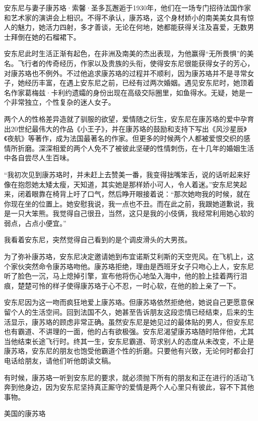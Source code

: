 安东尼与妻子康苏珞·索馨·圣多瓦邂逅于1930年，他们在一场专门招待法国作家和艺术家的演讲会上相识。不得不承认，康苏珞，这个身材娇小的南美美女具有惊人的魅力，她活力四射，多才善谈，无论在何地，她都能获得关注及喜爱，无数男士拜倒在她的石榴裙下。

安东尼此时生活正渐有起色，在非洲及南美的杰出表现，为他赢得“无所畏惧”的美名。飞行者的传奇经历，作家以及贵族的头衔，使得安东尼很能获得女子的芳心，对康苏珞也不例外。不过他追求康苏珞的过程并不顺利，因为康苏珞并不是寻常女子，她经历丰富，在遇上安东尼之前，已经有过两次婚姻。遇见安东尼时，她顶着名作家葛梅兹·卡利约遗孀的身份出现在高级交际圈里，如鱼得水。无疑，她是一个非常独立，个性复杂的迷人女子。

两个人的性格差异造就了驯服的欲望，爱情随之衍生，安东尼在康苏珞的爱中孕育出20世纪最伟大的作品《小王子》，并在康苏珞的鼓励和支持下写出《风沙星辰》《夜航》等著作，成为法国最著名的作家。但更多的时候两个人都被爱恨交织的感情所折磨。深深相爱的两个人免不了被彼此坚硬的性情刺伤，在十几年的婚姻生活中各自尝尽人生百味。

“我初次见到康苏珞时，并未赶上去赞美一番，我变得拙嘴笨舌，说的话听起来好像在抱怨她太矮太瘦，天知道，其实她是那样娇小可人，令人着迷。”安东尼笑起来，闭着眼靠在椅背上吁了口气，然后睁开眼接着说：“那次她吻我的时候，就在你现在坐的位置上。她安慰我说，我一点也不丑。而在此之前，我跟她道歉说，我是一只大笨熊。我觉得自己很丑，当然，这只是我的小伎俩，我经常利用她心软的弱点，占点小便宜。”

我看着安东尼，突然觉得自己看到的是个调皮滑头的大男孩。

为了弥补康苏珞，安东尼决定邀请她到布宜诺斯艾利斯的天空兜风。在飞机上，这个家伙突然命令康苏珞吻他。康苏珞拒绝，理由是西班牙女子只吻心上人，安东尼听了脸色一沉，马上熄掉引擎，宣布他将伤心地坠入海中，他的脸上挂着两行泪痕，楚楚可怜的样子使得康苏珞于心不忍，一时心软，在他的脸上亲了一下。

安东尼因为这一吻而疯狂地爱上康苏珞。但康苏珞依然拒绝他，她说自己更愿意保留个人的生活空间。回到法国不久，她甚至告诉朋友这段恋情已经结束，后来的生活显示，康苏珞的顾虑非常正确。虽然安东尼是她见过的最体贴的男人，但安东尼也有霸道、不讲理的一面，他的占有欲极强。安东尼渴望康苏珞随时陪伴他，尤其当他结束长途飞行时。终其一生，安东尼霸道、苛求别人的态度从未改变，不止是康苏珞，安东尼的朋友也饱受他霸道个性的折磨。只要他有兴致，无论何时都会打电话给朋友，请他们听他朗读文稿。

有时候，康苏珞一听到安东尼的要求，就必须抛下所有的朋友和正在进行的活动飞奔到他身边，因为安东尼坚持真正厮守的爱情是两个人心里只有彼此，容不下其他事物。

{\startalignment[center]
 \stopalignment}
美国的康苏珞

